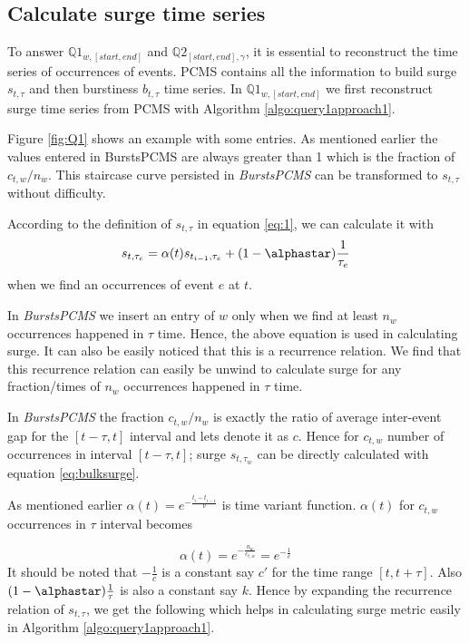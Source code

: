 \subsection{Calculate surge time series }
To answer $\mathbb{Q}1_{w,[start,end]}$ and $\mathbb{Q}2_{[start,end],\gamma}$,
it is essential to reconstruct the time series of occurrences of events.  PCMS
contains all the information to build surge $s_{t,\tau}$ and then burstiness
$b_{t,\tau}$ time series.  In $\mathbb{Q}1_{w,[start,end]}$ we first
reconstruct surge time series from PCMS with Algorithm \ref{algo:query1approach1}. 

Figure \ref{fig:Q1} shows an example with some entries. As mentioned
earlier the values entered in BurstsPCMS are always greater than 1 which is the
fraction of $c_{t,w}/n_w$. This staircase curve persisted in \emph{BurstsPCMS}
can be transformed to $s_{t,\tau}$ without difficulty. 

According to the definition of $s_{t,\tau}$ in equation \ref{eq:1}, we can
calculate it with $$s_{t,\tau_e} = \alpha(t) s_{t_{i-1}, \tau_e} + (1-
\alphastar) \frac{1}{\tau_e} $$ when we find an occurrences of event $e$ at
$t$.

In \emph{BurstsPCMS} we insert an entry of $w$ only when we find at least $n_w$
occurrences happened in $\tau$ time. Hence, the above equation is used in
calculating surge. It can also be easily noticed that this is a recurrence
relation. We find that this recurrence relation can easily be unwind to
calculate surge for any fraction/times of $n_w$ occurrences happened in $\tau$ time. 

In  \emph{BurstsPCMS} the fraction
$c_{t,w}/n_w$ is exactly the ratio of average inter-event gap for
the $[t-\tau,t]$ interval and lets denote it as $c$. Hence for  $c_{t,w}$
number of occurrences in interval $[t-\tau,t]$; surge $s_{t,\tau_w}$ can be
directly calculated with equation \ref{eq:bulksurge}.  

As mentioned earlier $\alpha(t) = e^{-\frac{t_i-t_{i-1}}{\nu}}$ 
is time variant function. $\alpha(t)$ for $c_{t,w}$ occurrences in $\tau$ interval becomes 

$$\alpha(t) =  e^{-\frac{n_w}{c_{t,w}}} = e^{-\frac{1}{c}}$$ 
It should be noted that $-\frac{1}{c}$ is a constant say $c'$ for the time range $[t,t+\tau]$.
Also $(1-\alphastar) \frac{1}{\tau}$ is also a constant say $k$.  Hence by
expanding the recurrence relation of $s_{t,\tau}$, we get the following which
helps in calculating surge metric easily in Algorithm
\ref{algo:query1approach1}.  


